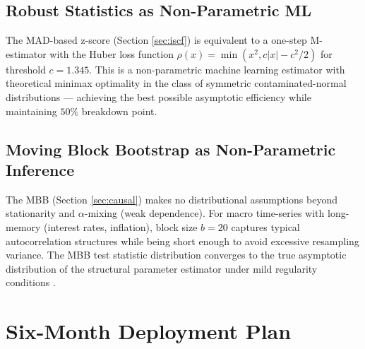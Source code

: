 \documentclass[12pt,a4paper]{article}
\begin{document}
\subsection{Robust Statistics as Non-Parametric ML}

The MAD-based z-score (Section \ref{sec:iscf}) is equivalent to a one-step M-estimator with the Huber loss function $\rho(x) = \min(x^2, c|x| - c^2/2)$ for threshold $c = 1.345$. This is a non-parametric machine learning estimator with theoretical minimax optimality in the class of symmetric contaminated-normal distributions — achieving the best possible asymptotic efficiency while maintaining $50\%$ breakdown point.

\subsection{Moving Block Bootstrap as Non-Parametric Inference}

The MBB (Section \ref{sec:causal}) makes no distributional assumptions beyond stationarity and $\alpha$-mixing (weak dependence). For macro time-series with long-memory (interest rates, inflation), block size $b = 20$ captures typical autocorrelation structures while being short enough to avoid excessive resampling variance. The MBB test statistic distribution converges to the true asymptotic distribution of the structural parameter estimator under mild regularity conditions \citep{kunsch1989}.

\section{Six-Month Deployment Plan}
\label{sec:sixmonth}
\end{document}
